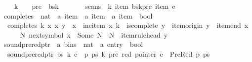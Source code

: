 \begin{isabellebody}
\ \ \ \ k\ {\isachargreater}{\kern0pt}\ {}\ {\isasymand}\ pre\ {\isacharless}{\kern0pt}\ {\isacharbar}{\kern0pt}bs{\isacharbang}{\kern0pt}{\isacharparenleft}{\kern0pt}k{\isacharminus}{\kern0pt}{}{\isacharparenright}{\kern0pt}{\isacharbar}{\kern0pt}\ {\isasymand}\isanewline
\ \ \ \ \ \ scans\ {\isasymomega}\ k\ {\isacharparenleft}{\kern0pt}item\ {\isacharparenleft}{\kern0pt}bs{\isacharbang}{\kern0pt}{\isacharparenleft}{\kern0pt}k{\isacharminus}{\kern0pt}{}{\isacharparenright}{\kern0pt}{\isacharbang}{\kern0pt}pre{\isacharparenright}{\kern0pt}{\isacharparenright}{\kern0pt}\ {\isacharparenleft}{\kern0pt}item\ e{\isacharparenright}{\kern0pt}{\isachardoublequoteclose}\isanewline
\isanewline
{}\isamarkupfalse%
\ completes\ {\isacharcolon}{\kern0pt}{\isacharcolon}{\kern0pt}\ {\isachardoublequoteopen}nat\ {\isasymRightarrow}\ {\isacharprime}{\kern0pt}a\ item\ {\isasymRightarrow}\ {\isacharprime}{\kern0pt}a\ item\ {\isasymRightarrow}\ {\isacharprime}{\kern0pt}a\ item\ {\isasymRightarrow}\ bool{\isachardoublequoteclose}\ \isanewline
\ \ {\isachardoublequoteopen}completes\ k\ x{\isacharprime}{\kern0pt}\ x\ y\ {\isasymequiv}\ x\ {\isacharequal}{\kern0pt}\ inc{\isacharunderscore}{\kern0pt}item\ x{\isacharprime}{\kern0pt}\ k\ {\isasymand}\ is{\isacharunderscore}{\kern0pt}complete\ y\ {\isasymand}\ item{\isacharunderscore}{\kern0pt}origin\ y\ {\isacharequal}{\kern0pt}\ item{\isacharunderscore}{\kern0pt}end\ x{\isacharprime}{\kern0pt}\ {\isasymand}\isanewline
\ \ \ \ {\isacharparenleft}{\kern0pt}{\isasymexists}N{\isachardot}{\kern0pt}\ next{\isacharunderscore}{\kern0pt}symbol\ x{\isacharprime}{\kern0pt}\ {\isacharequal}{\kern0pt}\ Some\ N\ {\isasymand}\ N\ {\isacharequal}{\kern0pt}\ item{\isacharunderscore}{\kern0pt}rule{\isacharunderscore}{\kern0pt}head\ y{\isacharparenright}{\kern0pt}{\isachardoublequoteclose}\isanewline
\isanewline
{}\isamarkupfalse%
\ sound{\isacharunderscore}{\kern0pt}prered{\isacharunderscore}{\kern0pt}ptr\ {\isacharcolon}{\kern0pt}{\isacharcolon}{\kern0pt}\ {\isachardoublequoteopen}{\isacharprime}{\kern0pt}a\ bins\ {\isasymRightarrow}\ nat\ {\isasymRightarrow}\ {\isacharprime}{\kern0pt}a\ entry\ {\isasymRightarrow}\ bool{\isachardoublequoteclose}\ \isanewline
\ \ {\isachardoublequoteopen}sound{\isacharunderscore}{\kern0pt}prered{\isacharunderscore}{\kern0pt}ptr\ bs\ k\ e\ {\isasymequiv}\ {\isasymforall}p\ ps\ k{\isacharprime}{\kern0pt}\ pre\ red{\isachardot}{\kern0pt}\ pointer\ e\ {\isacharequal}{\kern0pt}\ PreRed\ p\ ps\ {\isasymand}\isanewline

\end{isabellebody}

